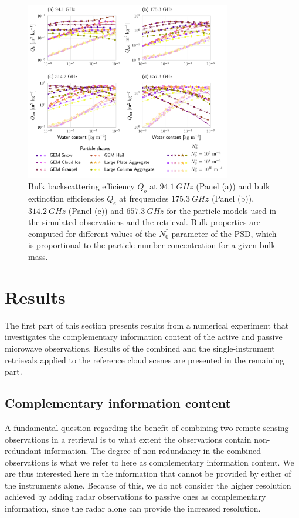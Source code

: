 \documentclass[journal abbreviation, manuscript]{copernicus}
\begin{document}
\begin{figure}
  \centering
  \includegraphics[width=0.8\textwidth]{../plots/particle_properties_d14}
  \caption{Bulk backscattering efficiency $Q_b$ at $94.1\ \unit{GHz}$ (Panel
    (a)) and bulk extinction efficiencies $Q_{e}$ at frequencies
    $175.3\ \unit{GHz}$ (Panel (b)), $314.2\ \unit{GHz}$ (Panel (c)) and
    $657.3\ \unit{GHz}$ for the particle models used in the simulated
    observations and the retrieval. Bulk properties are computed for different
    values of the $N_0^*$ parameter of the PSD, which is proportional to the
    particle number concentration for a given bulk mass.}
  \label{fig:particle_properties}
\end{figure}

\section{Results}
\label{sec:results}

The first part of this section presents results from a numerical experiment that
investigates the complementary information content of the active and passive
microwave observations. Results of the combined and the single-instrument
retrievals applied to the reference cloud scenes are presented in the remaining
part.

\subsection{Complementary information content}
\label{sec:simple_cloud}

A fundamental question regarding the benefit of combining two remote sensing
observations in a retrieval is to what extent the observations contain
non-redundant information. The degree of non-redundancy in the combined
observations is what we refer to here as complementary information content. We
are thus interested here in the information that cannot be provided by either of
the instruments alone. Because of this, we do not consider the higher resolution
achieved by adding radar observations to passive ones as complementary
information, since the radar alone can provide the increased resolution.
\end{document}
